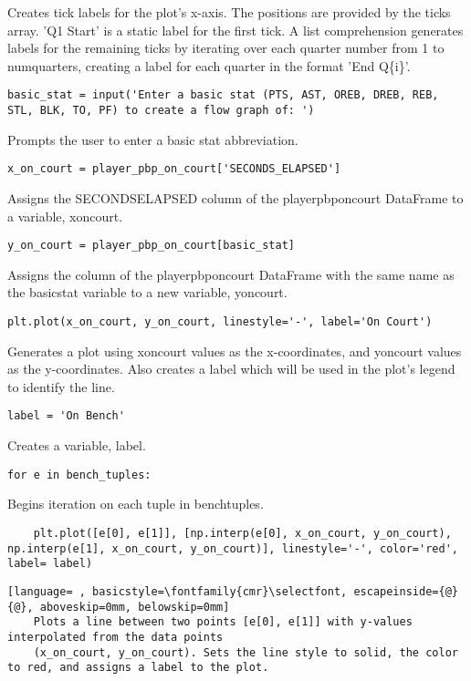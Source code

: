 \documentclass{article}
\begin{document}
Creates tick labels for the plot's x-axis. The positions are provided by the ticks array. 'Q1 Start' is a static label for the first tick. A list comprehension generates labels for the remaining ticks by iterating over each quarter number from 1 to num\textunderscore quarters, creating a label for each quarter in the format 'End Q\{i\}'.
\begin{lstlisting}
basic_stat = input('Enter a basic stat (PTS, AST, OREB, DREB, REB, STL, BLK, TO, PF) to create a flow graph of: ')
\end{lstlisting}
Prompts the user to enter a basic stat abbreviation.
\begin{lstlisting}
x_on_court = player_pbp_on_court['SECONDS_ELAPSED']
\end{lstlisting}
Assigns the SECONDS\textunderscore ELAPSED column of the player\textunderscore pbp\textunderscore on\textunderscore court DataFrame to a variable, x\textunderscore on\textunderscore court.
\begin{lstlisting}
y_on_court = player_pbp_on_court[basic_stat]
\end{lstlisting}
Assigns the column of the player\textunderscore pbp\textunderscore on\textunderscore court DataFrame with the same name as the basic\textunderscore stat variable to a new variable, y\textunderscore on\textunderscore court.
\begin{lstlisting}
plt.plot(x_on_court, y_on_court, linestyle='-', label='On Court')
\end{lstlisting}
Generates a plot using x\textunderscore on\textunderscore court values as the x-coordinates, and y\textunderscore on\textunderscore court values as the y-coordinates. Also creates a label which will be used in the plot's legend to identify the line.
\begin{lstlisting}
label = 'On Bench'
\end{lstlisting}
Creates a variable, label.
\begin{lstlisting}
for e in bench_tuples:
\end{lstlisting}
Begins iteration on each tuple in bench\textunderscore tuples.
\begin{lstlisting}
    plt.plot([e[0], e[1]], [np.interp(e[0], x_on_court, y_on_court), np.interp(e[1], x_on_court, y_on_court)], linestyle='-', color='red', label= label)
\end{lstlisting}
\begin{lstlisting}[language= , basicstyle=\fontfamily{cmr}\selectfont, escapeinside={@}{@}, aboveskip=0mm, belowskip=0mm]
    Plots a line between two points [e[0], e[1]] with y-values interpolated from the data points
    (x_on_court, y_on_court). Sets the line style to solid, the color to red, and assigns a label to the plot.
\end{lstlisting}
\end{document}
